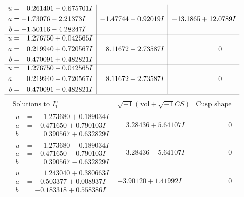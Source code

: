 \documentclass[1p]{elsarticle_modified}
\theoremstyle{definition}
\newcommand{\I}{\sqrt{-1}}
\begin{document}
$$\begin{array}{c|c|c}
\begin{aligned}
u &= \phantom{-}0.261401 - 0.675701 I \\
a &= -1.73076 - 2.21373 I \\
b &= -1.50116 - 4.28247 I\end{aligned}
 & -1.47744 - 0.92019 I & -13.1865 + 12.0789 I \\ \hline\begin{aligned}
u &= \phantom{-}1.276750 + 0.042565 I \\
a &= \phantom{-}0.219940 + 0.720567 I \\
b &= \phantom{-}0.470091 + 0.482821 I\end{aligned}
 & \phantom{-}8.11672 - 2.73587 I & \phantom{-0.000000 } 0 \\ \hline\begin{aligned}
u &= \phantom{-}1.276750 - 0.042565 I \\
a &= \phantom{-}0.219940 - 0.720567 I \\
b &= \phantom{-}0.470091 - 0.482821 I\end{aligned}
 & \phantom{-}8.11672 + 2.73587 I & \phantom{-0.000000 } 0\\
 \hline 
 \end{array}$$\newpage$$\begin{array}{c|c|c}  
\text{Solutions to }I^u_{1}& \I (\text{vol} + \sqrt{-1}CS) & \text{Cusp shape}\\
 \hline 
\begin{aligned}
u &= \phantom{-}1.273680 + 0.189034 I \\
a &= -0.471650 + 0.790103 I \\
b &= \phantom{-}0.390567 + 0.632829 I\end{aligned}
 & \phantom{-}3.28436 + 5.64107 I & \phantom{-0.000000 } 0 \\ \hline\begin{aligned}
u &= \phantom{-}1.273680 - 0.189034 I \\
a &= -0.471650 - 0.790103 I \\
b &= \phantom{-}0.390567 - 0.632829 I\end{aligned}
 & \phantom{-}3.28436 - 5.64107 I & \phantom{-0.000000 } 0 \\ \hline\begin{aligned}
u &= \phantom{-}1.243040 + 0.380663 I \\
a &= -0.503377 + 0.008937 I \\
b &= -0.183318 + 0.558386 I\end{aligned}
 & -3.90120 + 1.41992 I & \phantom{-0.000000 } 0 \\ \hline\begin{aligned}

\end{aligned}
\end{array}$$
\end{document}

